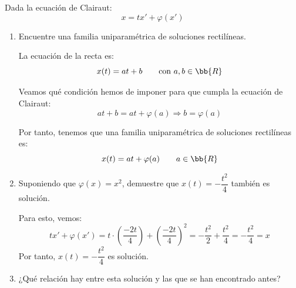 \begin{ejercicio}
    Dada la ecuación de Clairaut:
    \begin{equation*}
        x = tx' + \varphi(x')
    \end{equation*}
    \begin{enumerate}
        \item Encuentre una familia uniparamétrica de soluciones rectilíneas.
        
        La ecuación de la recta es:
        \begin{equation*}
            x(t)=at + b \qquad \text{con } a, b\in \bb{R}
        \end{equation*}

        Veamos qué condición hemos de imponer para que cumpla la ecuación de Clairaut:
        \begin{equation*}
            at + b = at + \varphi(a) \Longrightarrow b = \varphi(a)
        \end{equation*}

        Por tanto, tenemos que una familia uniparamétrica de soluciones rectilíneas es:
        \begin{equation*}
            x(t) = at + \varphi(a) \qquad a\in \bb{R}
        \end{equation*}
        \item Suponiendo que \(\varphi(x) = x^2\), demuestre que \(x(t) = -\dfrac{t^2}{4}\) también es solución.
        
        Para esto, vemos:
        \begin{equation*}
            tx'+\varphi(x') = t\cdot \left(\dfrac{-2t}{4}\right) + \left(\dfrac{-2t}{4}\right)^2 = -\dfrac{t^2}{2} + \dfrac{t^2}{4} = -\dfrac{t^2}{4} = x
        \end{equation*}
        Por tanto, \(x(t) = -\dfrac{t^2}{4}\) es solución.
        \item ¿Qué relación hay entre esta solución y las que se han encontrado antes?
        
    \end{enumerate}
\end{ejercicio}


